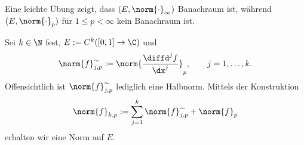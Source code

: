 \begin{bsp}
\begin{bspenum}
Eine leichte Übung zeigt, dass $(E,\norm{\cdot}_\infty)$ Banachraum ist,
während $(E,\norm{\cdot}_p)$ für $1\le p <\infty$ kein Banachraum ist.
\item Sei $k\in\N$ fest, $E:=C^k([0,1]\to\C)$ und
\begin{align*}
\norm{f}_{j,p}^{\sim} := \norm{\frac{\diffd^j f}{\dx^j}}_p,\qquad
j=1,\ldots,k.
\end{align*}
Offensichtlich ist $\norm{f}_{j,p}^{\sim}$ lediglich eine
Halbnorm. Mittels der Konstruktion
\begin{align*}
\norm{f}_{k,p} := \sum\limits_{j=1}^k \norm{f}_{j,p}^{\sim} + \norm{f}_p
\end{align*}
erhalten wir eine Norm auf $E$.\bsphere
\end{bspenum}
\end{bsp}

